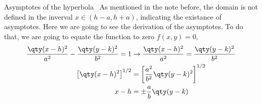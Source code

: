 \documentclass[../main-notes.tex]{subfile}
\begin{document}
\begin{note}{Asymptotes of the hyperbola}{~}
    As mentioned in the note before, the domain is not defined in the inverval $x\in(h-a,h+a)$, indicating the existance of asymptotes.
    Here we are going to see the derivation of the asymptotes.
    To do that, we are going to equate the function to zero $f(x,y)=0$,
    \begin{align*}
        \frac{\qty(x-h)^2}{a^2} - \frac{\qty(y-k)^2}{b^2} = 1 &\to\frac{\qty(x-h)^2}{a^2} = \frac{\qty(y-k)^2}{b^2} \\
        \left[\qty(x-h)^2\right]^{1/2} &= \left[\frac{a^2}{b^2}\qty(y-k)^2\right]^{1/2} \\
        x-h &= \pm\frac{a}{b}\qty(y-k) 
    \end{align*}
\end{note}
\end{document}
